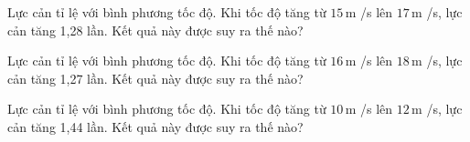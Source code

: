\begin{bt}
Lực cản tỉ lệ với bình phương tốc độ. Khi tốc độ tăng từ $15\,\text{m}$ /s lên $17\,\text{m}$ /s, lực cản tăng 1,28 lần. Kết quả này được suy ra thế nào?
\end{bt}

\begin{bt}
Lực cản tỉ lệ với bình phương tốc độ. Khi tốc độ tăng từ $16\,\text{m}$ /s lên $18\,\text{m}$ /s, lực cản tăng 1,27 lần. Kết quả này được suy ra thế nào?
\end{bt}

\begin{bt}
Lực cản tỉ lệ với bình phương tốc độ. Khi tốc độ tăng từ $10\,\text{m}$ /s lên $12\,\text{m}$ /s, lực cản tăng 1,44 lần. Kết quả này được suy ra thế nào?
\end{bt}
